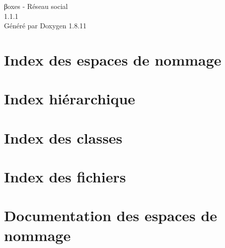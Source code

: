 \documentclass[twoside]{book}
\newcommand{\+}{\discretionary{\mbox{\scriptsize$\hookleftarrow$}}{}{}}
\newcommand{\clearemptydoublepage}{%
  \newpage{\pagestyle{empty}\cleardoublepage}%
}
\begin{document}
\hypersetup{pageanchor=false,
             bookmarksnumbered=true,
             pdfencoding=unicode
            }
\begin{titlepage}
\vspace*{7cm}
\begin{center}%
{\Large βoxes -\/ Réseau social \\[1ex]\large 1.\+1.\+1 }\\
\vspace*{1cm}
{\large Généré par Doxygen 1.8.11}\\
\end{center}
\end{titlepage}
\clearemptydoublepage
\tableofcontents
\clearemptydoublepage
{}
\hypersetup{pageanchor=true}

\chapter{Index des espaces de nommage}

\chapter{Index hiérarchique}

\chapter{Index des classes}

\chapter{Index des fichiers}

\chapter{Documentation des espaces de nommage}

















\end{document}
